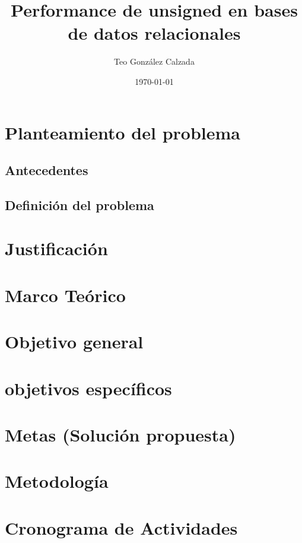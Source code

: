 \documentclass{article}
\title{Performance de unsigned en bases de datos relacionales}
\author{Teo González Calzada}
\date{\today}
\begin{document}


\clearpage

\tableofcontents

\clearpage


\section{Planteamiento del problema}
\subsection{Antecedentes}\label{sec:Ant}



\subsection{Definición del problema}

\section{Justificación}

\section{Marco Teórico}

\section{Objetivo general}

\section{objetivos específicos}

\section{Metas (Solución propuesta)}

\section{Metodología}

\section{Cronograma de Actividades}



\end{document}
